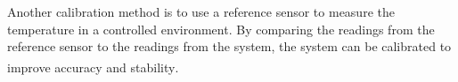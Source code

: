 \documentclass[12pt]{article}
\begin{document}
Another calibration method is to use a reference sensor to measure the temperature in a controlled environment. By comparing the readings from the reference sensor to the readings from the system, the system can be calibrated to improve accuracy and stability\textsuperscript{\cite{calibration-methods}}.


\newpage

\end{document}
